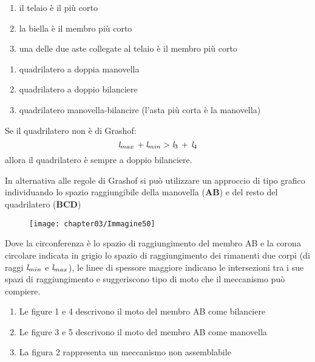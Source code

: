 \begin{minipage}{.45\textwidth}
\begin{enumerate}[-]
		\item il telaio è il più corto
		\item la biella è il membro più corto
		\item una delle due aste collegate al telaio è il membro più corto
	\end{enumerate}
\end{minipage}
\hfill
\begin{minipage}{.45\textwidth}
\begin{enumerate}[$\Rightarrow$]
\item quadrilatero a doppia manovella
\item quadrilatero a doppio bilanciere
\item quadrilatero manovella-bilancire (l'asta più corta è la manovella)
\end{enumerate}
\end{minipage}
\vspace{1mm}

Se il quadrilatero non è di Grashof:
\[\emph{l}_{max}\,+\emph{l}_{min} > \emph{l}_3\,+\,\emph{l}_4\]
allora il quadrilatero è sempre a doppio bilanciere.

In alternativa alle regole di Grashof si può utilizzare un approccio di tipo grafico individuando lo spazio raggiungibile della manovella ($\mathbf{AB}$) e del resto del quadrilatero ($\mathbf{BCD}$)

\begin{figure}[!h]
\centering
\texttt{[image: chapter03/Immagine50]}
\end{figure}
	
	Dove la circonferenza è lo spazio di raggiungimento del membro AB e la corona circolare indicata in grigio lo spazio di raggiungimento dei rimanenti due corpi (di raggi $\emph{l}_{min}$ e $\emph{l}_{max}$), le linee di spessore maggiore indicano le intersezioni tra i sue spazi di raggiungimento e suggeriscono tipo di moto che il meccanismo può compiere.
\begin{enumerate}[$\rightarrow$]
	\item Le figure 1 e 4 descrivono il moto del membro AB come bilanciere
	\item Le figure 3 e 5 descrivono il moto del membro AB come manovella
	\item La figura 2 rappresenta un meccanismo non assemblabile
\end{enumerate}
	
